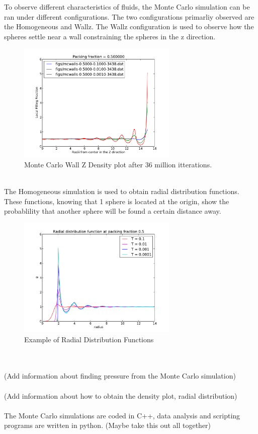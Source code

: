 \documentclass[a4paper,12pt]{article}
\begin{document}
To observe different characteristics of fluids, the Monte Carlo simulation can be ran under different configurations.  The two configurations primarliy observed are the Homogeneous and Wallz.
The Wallz configuration is used to observe how the spheres settle near a wall constraining the spheres in the z direction.
\begin{figure}[h]
\centering
\includegraphics[width=3in]{walls-50.pdf}
\caption{Monte Carlo Wall Z Density plot after 36 million itterations.}
\end{figure}\\
The Homogeneous simulation is used to obtain radial distribution functions.  These functions, knowing that 1 sphere is located at the origin, show the probablility that another sphere will be found a certain distance away.
\begin{figure}[h]
\centering
\includegraphics[width=3in]{radial-distribution-50.pdf}
\caption{Example of Radial Distribution Functions}
\end{figure}\\
\\
(Add information about finding pressure from the Monte Carlo simulation)\\
\\
(Add information about how to obtain the density plot, radial distribution)\\
\\
The Monte Carlo simulations are coded in C++, data analysis and scripting programs are written in python. (Maybe take this out all together)
\end{document}
